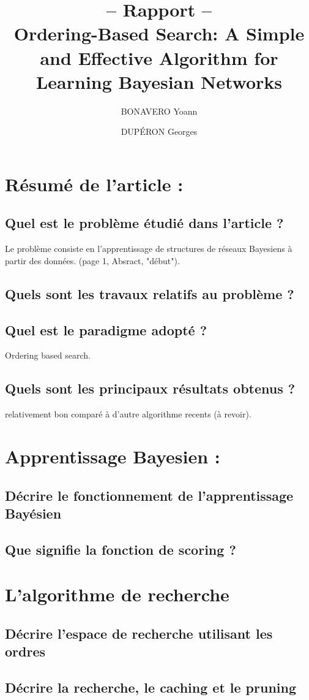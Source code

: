\documentclass[french,a4paper]{article}
\title{-- Rapport -- \\ Ordering-Based Search: A Simple and Effective Algorithm for Learning Bayesian Networks}
\author{BONAVERO Yoann \and DUPÉRON Georges}
\begin{document}
\maketitle
\newpage
\section{Résumé de l’article :}
\subsection{Quel est le problème étudié dans l’article ?}
Le problème consiste en l'apprentissage de structures de réseaux Bayesiens à partir des données.
(page 1, Absract, "début").
\subsection{Quels sont les travaux relatifs au problème ? }
\subsection{Quel est le paradigme adopté ?}
Ordering based search.
\subsection{Quels sont les principaux résultats obtenus ?}
relativement bon comparé à d'autre algorithme recents (à revoir).

\section{Apprentissage Bayesien :}
\subsection{Décrire le fonctionnement de l'apprentissage Bayésien}
\subsection{Que signifie la fonction de scoring ?}

\section{L'algorithme de recherche}
\subsection{Décrire l'espace de recherche utilisant les ordres}
\subsection{Décrire la recherche, le caching et le pruning}
\end{document}
